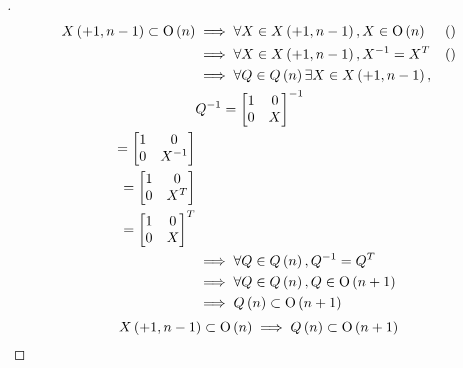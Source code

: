 \documentclass[stu, babel, american, biblatex, a4paper, leqno, draftall]{apa7}
\begin{document}
\begin{proof}[]
    \begin{align*}
        X\left(+1, n-1\right)\subset\operatorname{O}\left(n\right)
        & \implies
        \forall X\in X\left(+1, n-1\right), X\in\operatorname{O}\left(n\right) & \text{()} \\
        & \implies
        \forall X\in X\left(+1, n-1\right), X^{-1}=X^T & \text{()} \\
        & \implies
        \forall Q\in Q\left(n\right)
        \exists X\in X\left(+1, n-1\right), \\
        & Q^{-1}
        =\begin{bmatrix}
        1 & 0 \\
        0 & X \\
        \end{bmatrix}^{-1} \\
        =\begin{bmatrix}
        1 & 0 \\
        0 & X^{-1} \\
        \end{bmatrix} \\
        =\begin{bmatrix}
        1 & 0 \\
        0 & X^{T} \\
        \end{bmatrix} \\
        =\begin{bmatrix}
        1 & 0 \\
        0 & X \\
        \end{bmatrix}^{T} \\
        & \implies
        \forall Q\in Q\left(n\right), Q^{-1}=Q^{T} \\
        & \implies
        \forall Q\in Q\left(n\right), Q\in\operatorname{O}\left(n+1\right) \\
        & \implies
        Q\left(n\right)\subset\operatorname{O}\left(n+1\right)
    \end{align*}
    \begin{equation}
        X\left(+1, n-1\right)\subset\operatorname{O}\left(n\right)
        \implies
        Q\left(n\right)\subset\operatorname{O}\left(n+1\right)
    \end{equation}


\end{proof}
\end{document}
